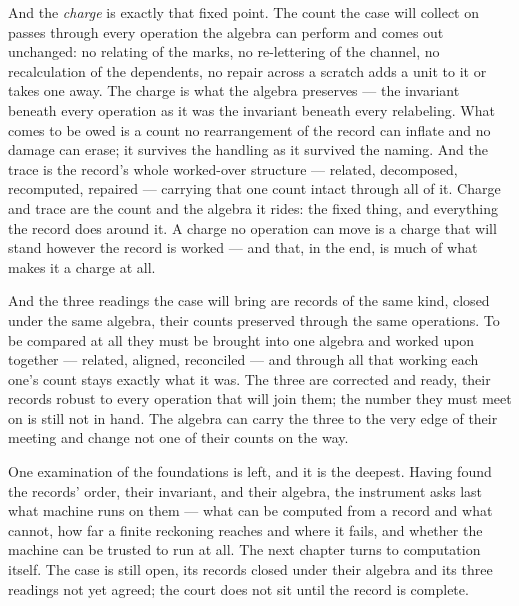 And the \emph{charge} is exactly that fixed point. The count the case will collect on passes through every
operation the algebra can perform and comes out unchanged: no relating of the marks, no re-lettering of the
channel, no recalculation of the dependents, no repair across a scratch adds a unit to it or takes one away. The
charge is what the algebra preserves --- the invariant beneath every operation as it was the invariant beneath
every relabeling. What comes to be owed is a count no rearrangement of the record can inflate and no damage can
erase; it survives the handling as it survived the naming. And the trace is the record's whole worked-over
structure --- related, decomposed, recomputed, repaired --- carrying that one count intact through all of it.
Charge and trace are the count and the algebra it rides: the fixed thing, and everything the record does around
it. A charge no operation can move is a charge that will stand however the record is worked --- and that, in the
end, is much of what makes it a charge at all.

And the three readings the case will bring are records of the same kind, closed under the same algebra, their
counts preserved through the same operations. To be compared at all they must be brought into one algebra and
worked upon together --- related, aligned, reconciled --- and through all that working each one's count stays
exactly what it was. The three are corrected and ready, their records robust to every operation that will join
them; the number they must meet on is still not in hand. The algebra can carry the three to the very edge of
their meeting and change not one of their counts on the way.

One examination of the foundations is left, and it is the deepest. Having found the records' order, their
invariant, and their algebra, the instrument asks last what machine runs on them --- what can be computed from a
record and what cannot, how far a finite reckoning reaches and where it fails, and whether the machine can be
trusted to run at all. The next chapter turns to computation itself. The case is still open, its records closed
under their algebra and its three readings not yet agreed; the court does not sit until the record is complete.

